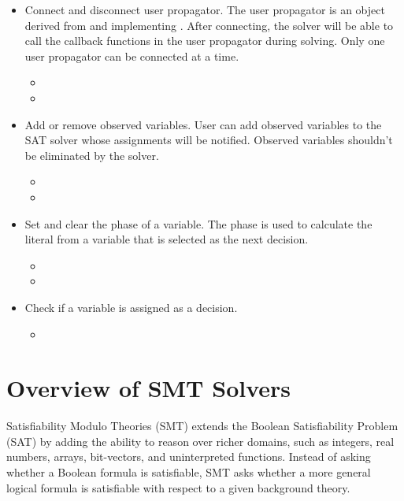 \begin{itemize}
  \item Connect and disconnect user propagator. The user propagator is an object derived from and implementing . After connecting, the solver will be able to call the callback functions in the user propagator during solving. Only one user propagator can be connected at a time.
  \begin{itemize}
    \item {}
    \item {}
  \end{itemize}
  \item Add or remove observed variables. User can add observed variables to the SAT solver whose assignments will be notified. Observed variables shouldn't be eliminated by the solver.
  \begin{itemize}
    \item {}
    \item {}
  \end{itemize}
  \item Set and clear the phase of a variable. The phase is used to calculate the literal from a variable that is selected as the next decision.
  \begin{itemize}
    \item {}
    \item {}
  \end{itemize}
  \item Check if a variable is assigned as a decision.
  \begin{itemize}
    \item {}
  \end{itemize}
\end{itemize}

\section{Overview of SMT Solvers}

Satisfiability Modulo Theories (SMT) extends the Boolean Satisfiability Problem (SAT) by adding the ability to reason over richer domains, such as integers, real numbers, arrays, bit-vectors, and uninterpreted functions. Instead of asking whether a Boolean formula is satisfiable, SMT asks whether a more general logical formula is satisfiable with respect to a given background theory.

